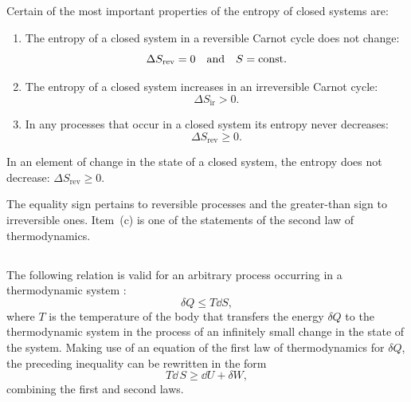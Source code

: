 \subsection{}\label{11.4.3} Certain of the most important properties of the entropy of closed systems  are:
\begin{enumerate}[label=(\alph*),noitemsep,nolistsep]
\item The entropy of a closed system in a reversible Carnot cycle  does not change:
\begin{equation*}%
\Delta S_{\textrm{rev}} = 0 \qand S = \textrm{const.}
\end{equation*}
\item The entropy of a closed system increases in an irreversible Carnot cycle:
\begin{equation*}%
\Delta S_{\textrm{ir}} > 0.
\end{equation*}
\item In any processes that occur in a closed system its entropy never decreases:
\begin{equation*}%
\Delta S_{\textrm{rev}} \geqslant 0.
\end{equation*}
\end{enumerate}
In an element of change in the state of a closed system, the entropy does not decrease: $\Delta S_{\textrm{rev}} \geq 0$.

The equality sign pertains to reversible processes and the greater-than sign to irreversible ones. Item~(c) is one of the statements of the second law of thermodynamics.

\subsection{}\label{11.4.4} The following relation is valid for an arbitrary process occurring in a thermodynamic system :
\begin{equation*}%
\delta Q \leq  T \dd S,
\end{equation*}
where $T$ is the temperature of the body that transfers the energy $\delta Q$ to the thermodynamic system in the process of an infinitely small change in the state of the system. Making use of an equa­tion of the first law of thermodynamics  for $\delta Q$, the preceding inequality can be rewritten in the form
\begin{equation*}%
T \dd \, S \geq \dd U + \delta W,
\end{equation*}
combining the first and second laws.

